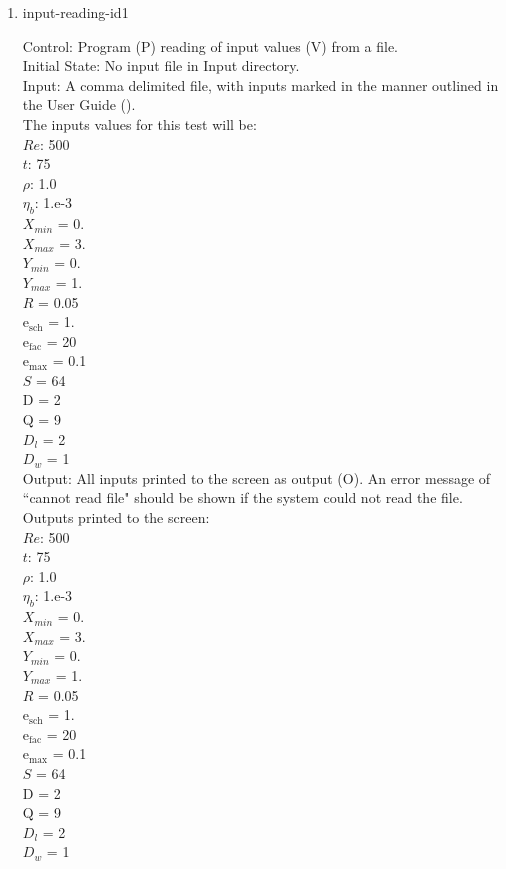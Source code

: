 \documentclass[12pt, titlepage]{article}
\begin{document}
\begin{enumerate}

\item{input-reading-id1\\}

Control: Program (P) reading of input values (V) from a file.\\
					
Initial State: No input file in Input directory.\\
					
Input: A comma delimited file, with inputs marked in the manner outlined in the User Guide (\citet{LBM_UserGuide_PM}).\\The inputs values for this test will be:\\$Re$: 500\\
$t$: 75\\
$\rho$: 1.0\\
$\eta_b$: 1.e-3\\
$X_{min}$ = 0.\\
$X_{max}$ = 3.\\
$Y_{min}$ = 0.\\
$Y_{max}$ = 1.\\
$R$ = 0.05\\
$\mathrm{e_{sch}}$ = 1.\\
$\mathrm{e_{fac}}$ = 20\\
$\mathrm{e_{max}}$ = 0.1\\
$S$ = 64\\
$\mathrm{D}$ = 2\\
$\mathrm{Q}$ = 9\\
$D_{l}$ = 2\\
$D_{w}$ = 1\\

					
Output: All inputs printed to the screen as output (O). An error message of ``cannot read file" should be shown if the system could not read the file.\\
Outputs printed to the screen:\\
$Re$: 500\\
$t$: 75\\
$\rho$: 1.0\\
$\eta_b$: 1.e-3\\
$X_{min}$ = 0.\\
$X_{max}$ = 3.\\
$Y_{min}$ = 0.\\
$Y_{max}$ = 1.\\
$R$ = 0.05\\
$\mathrm{e_{sch}}$ = 1.\\
$\mathrm{e_{fac}}$ = 20\\
$\mathrm{e_{max}}$ = 0.1\\
$S$ = 64\\
$\mathrm{D}$ = 2\\
$\mathrm{Q}$ = 9\\
$D_{l}$ = 2\\
$D_{w}$ = 1\\


\end{enumerate}
\end{document}
